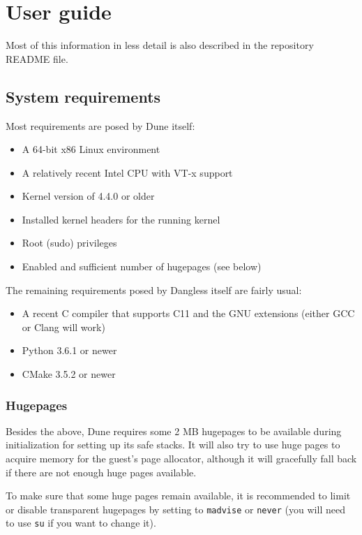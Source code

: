 \chapter{User guide}
\label{ch:user-guide}

Most of this information in less detail is also described in the repository README file.

\section{System requirements}

Most requirements are posed by Dune itself:

\begin{itemize}
	\item A 64-bit x86 Linux environment
	\item A relatively recent Intel CPU with VT-x support
	\item Kernel version of 4.4.0 or older
	\item Installed kernel headers for the running kernel
	\item Root (sudo) privileges
	\item Enabled and sufficient number of hugepages (see below)
\end{itemize}

The remaining requirements posed by Dangless itself are fairly usual:

\begin{itemize}
	\item A recent C compiler that supports C11 and the GNU extensions (either GCC or Clang will work)
	\item Python 3.6.1 or newer
	\item CMake 3.5.2 or newer
\end{itemize}

\subsection{Hugepages}

Besides the above, Dune requires some 2 MB hugepages to be available during initialization for setting up its safe stacks. It will also try to use huge pages to acquire memory for the guest's page allocator, although it will gracefully fall back if there are not enough huge pages available.

To make sure that some huge pages remain available, it is recommended to limit or disable transparent hugepages by setting  to \texttt{madvise} or \texttt{never} (you will need to use \texttt{su} if you want to change it).

